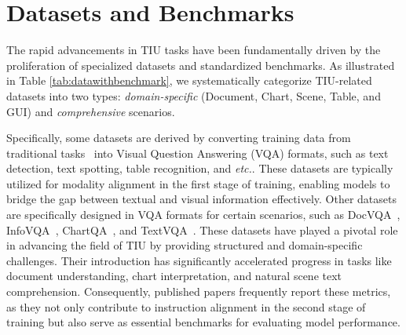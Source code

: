 \section{Datasets and Benchmarks}
\label{sec:datasets}


The rapid advancements in TIU tasks have been fundamentally driven by the proliferation of specialized datasets and standardized benchmarks. As illustrated in Table \ref{tab:datawithbenchmark}, we systematically categorize TIU-related datasets into two types: \textit{domain-specific} (Document, Chart, Scene, Table, and GUI) and \textit{comprehensive} scenarios. 


Specifically, some datasets are derived by converting training data from traditional tasks~\cite{guan2022industrial,guan2023self} into Visual Question Answering (VQA) formats, such as text detection, text spotting, table recognition, and \emph{etc.}. These datasets are typically utilized for modality alignment in the first stage of training, enabling models to bridge the gap between textual and visual information effectively. Other datasets are specifically designed in VQA formats for certain scenarios, such as DocVQA~\cite{mathew2021docvqa}, InfoVQA~\cite{mathew2022infographicvqa}, ChartQA~\cite{masry2022chartqa}, and TextVQA~\cite{singh2019towards}. These datasets have played a pivotal role in advancing the field of TIU by providing structured and domain-specific challenges. Their introduction has significantly accelerated progress in tasks like document understanding, chart interpretation, and natural scene text comprehension. Consequently, published papers frequently report these metrics, as they not only contribute to instruction alignment in the second stage of training but also serve as essential benchmarks for evaluating model performance.


